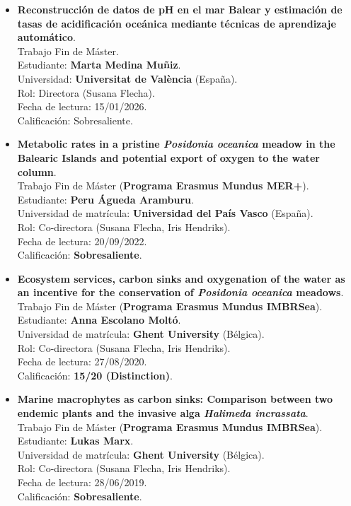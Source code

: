 \documentclass[11pt,a4paper]{article}
\begin{document}
\begin{itemize}[leftmargin=*]

    \item \textbf{Reconstrucción de datos de pH en el mar Balear y estimación de tasas de acidificación oceánica mediante técnicas de aprendizaje automático}.\\
    Trabajo Fin de Máster.\\
    Estudiante: \textbf{Marta Medina Muñiz}.\\
    Universidad: \textbf{Universitat de València} (España).\\
    Rol: Directora (Susana Flecha).\\
    Fecha de lectura: 15/01/2026.\\
    Calificación: Sobresaliente.

    \item \textbf{Metabolic rates in a pristine \textit{Posidonia oceanica} meadow in the Balearic Islands and potential export of oxygen to the water column}.\\
    Trabajo Fin de Máster (\textbf{Programa Erasmus Mundus MER+}).\\
    Estudiante: \textbf{Peru Águeda Aramburu}.\\
    Universidad de matrícula: \textbf{Universidad del País Vasco} (España).\\
    Rol: Co-directora (Susana Flecha, Iris Hendriks).\\
    Fecha de lectura: 20/09/2022.\\
    Calificación: \textbf{Sobresaliente}.

    \item \textbf{Ecosystem services, carbon sinks and oxygenation of the water as an incentive for the conservation of \textit{Posidonia oceanica} meadows}.\\
    Trabajo Fin de Máster (\textbf{Programa Erasmus Mundus IMBRSea}).\\
    Estudiante: \textbf{Anna Escolano Moltó}.\\
    Universidad de matrícula: \textbf{Ghent University} (Bélgica).\\
    Rol: Co-directora (Susana Flecha, Iris Hendriks).\\
    Fecha de lectura: 27/08/2020.\\
    Calificación: \textbf{15/20 (Distinction)}.

    \item \textbf{Marine macrophytes as carbon sinks: Comparison between two endemic plants and the invasive alga \textit{Halimeda incrassata}}.\\
    Trabajo Fin de Máster (\textbf{Programa Erasmus Mundus IMBRSea}).\\
    Estudiante: \textbf{Lukas Marx}.\\
    Universidad de matrícula: \textbf{Ghent University} (Bélgica).\\
    Rol: Co-directora (Susana Flecha, Iris Hendriks).\\
    Fecha de lectura: 28/06/2019.\\
    Calificación: \textbf{Sobresaliente}.


\end{itemize}
\end{document}
